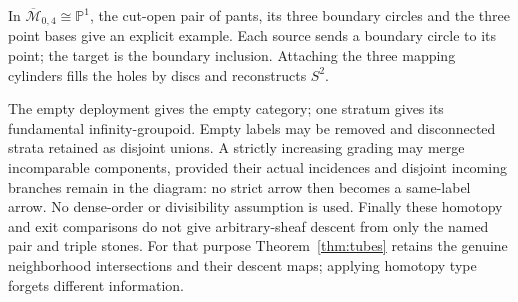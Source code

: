 \documentclass[11pt,a4paper]{article}
\theoremstyle{definition}
\begin{document}
In $\overline{\mathcal M}_{0,4}\cong\mathbb P^1$, the cut-open pair
of pants, its three boundary circles and the three point bases give
an explicit example. Each source sends a boundary circle to its point;
the target is the boundary inclusion. Attaching the three mapping
cylinders fills the holes by discs and reconstructs $S^2$.

The empty deployment gives the empty category; one stratum gives its
fundamental infinity-groupoid. Empty labels may be removed and
disconnected strata retained as disjoint unions. A strictly increasing
grading may merge incomparable components, provided their actual
incidences and disjoint incoming branches remain in the diagram: no
strict arrow then becomes a same-label arrow. No dense-order or
divisibility assumption is used. Finally these homotopy and exit
comparisons do not give arbitrary-sheaf descent from only the named
pair and triple stones. For that purpose Theorem~\ref{thm:tubes}
retains the genuine neighborhood intersections and their descent
maps; applying homotopy type forgets different information.
\end{document}
